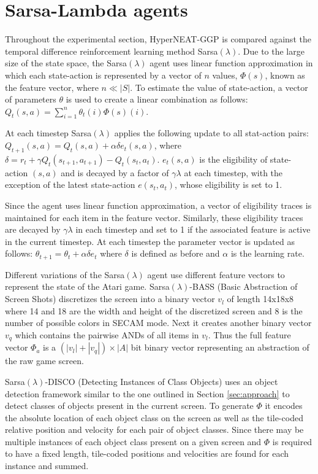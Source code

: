 \documentclass{sig-alternate}
\begin{document}
\section{Sarsa-Lambda agents}
\label{sec:sarsa}
Throughout the experimental section, HyperNEAT-GGP is compared against the temporal difference reinforcement learning method Sarsa$(\lambda)$. Due to the large size of the state space, the Sarsa$(\lambda)$ agent uses linear function approximation in which each state-action is represented by a vector of $n$ values, $\Phi(s)$, known as the feature vector, where $n \ll |S|$. To estimate the value of state-action, a vector of parameters $\theta$ is used to create a linear combination as follows: $Q_t(s,a) = \sum_{i=1}^n \theta_t(i) \Phi(s) (i)$.

At each timestep Sarsa$(\lambda)$ applies the following update to all stat-action pairs: $Q_{t+1}(s,a) = Q_t(s,a) + \alpha \delta e_t(s,a)$, where $\delta = r_t + \gamma Q_t(s_{t+1},a_{t+1}) - Q_t(s_t,a_t)$. $e_t(s,a)$ is the eligibility of state-action $(s,a)$ and is decayed by a factor of $\gamma \lambda$ at each timestep, with the exception of the latest state-action $e(s_t,a_t)$, whose eligibility is set to 1. 

Since the agent uses linear function approximation, a vector of eligibility traces is maintained for each item in the feature vector. Similarly, these eligibility traces are decayed by $\gamma \lambda$ in each timestep and set to 1 if the associated feature is active in the current timestep. At each timestep the parameter vector is updated as follows: $\theta_{t+1} = \theta_t + \alpha \delta e_t$ where $\delta$ is defined as before and $\alpha$ is the learning rate. 

Different variations of the Sarsa$(\lambda)$ agent use different feature vectors to represent the state of the Atari game. Sarsa$(\lambda)$-BASS (Basic Abstraction of Screen Shots) discretizes the screen into a binary vector $v_l$ of length 14x18x8 where 14 and 18 are the width and height of the discretized screen and 8 is the number of possible colors in SECAM mode. Next it creates another binary vector $v_q$ which contains the pairwise ANDs of all items in $v_l$. Thus the full feature vector $\Phi_a$ is a $(|v_l| + |v_q|) \times |A|$ bit binary vector representing an abstraction of the raw game screen. 

Sarsa$(\lambda)$-DISCO (Detecting Instances of Class Objects) uses an object detection framework similar to the one outlined in Section \ref{sec:approach} to detect classes of objects present in the current screen. To generate $\Phi$ it encodes the absolute location of each object class on the screen as well as the tile-coded relative position and velocity for each pair of object classes. Since there may be multiple instances of each object class present on a given screen and $\Phi$ is required to have a fixed length, tile-coded positions and velocities are found for each instance and summed. 
\end{document}
